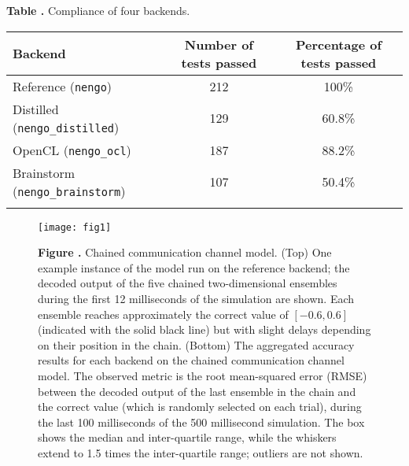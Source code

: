 \documentclass{frontiersSCNS}
\begin{document}
\begin{table}[!ht]
\textbf{\label{Tab:01} Table .}{
  Compliance of four backends.}

\processtable{ }
{\begin{tabular}{lcc}\toprule
 Backend & Number of tests passed & Percentage of tests passed\\\midrule
 Reference (\texttt{nengo}) & 212 & 100\% \\
 Distilled (\texttt{nengo\_distilled}) & 129 & 60.8\% \\
 OpenCL (\texttt{nengo\_ocl}) & 187 & 88.2\% \\
 Brainstorm (\texttt{nengo\_brainstorm}) & 107 & 50.4\% \\\botrule
\end{tabular}}{}
\end{table}




\begin{figure}[!ht]
\begin{center}
  \texttt{[image: fig1]}
\end{center}
\textbf{\label{fig:01} Figure .}
       {Chained communication channel model. (Top) One example instance
         of the model run on the reference backend; the decoded output
         of the five chained two-dimensional ensembles during the first
         12 milliseconds of the simulation are shown.
         Each ensemble reaches approximately the correct value of
         $[-0.6, 0.6]$ (indicated with the solid black line)
         but with slight delays depending on their position in the chain.
         (Bottom) The aggregated accuracy results for each backend on the
         chained communication channel model. The observed metric is the root
         mean-squared error (RMSE) between the decoded output of the last
         ensemble in the chain and the correct value (which is randomly
         selected on each trial), during the last 100 milliseconds of the
         500 millisecond simulation. The box shows the median and
         inter-quartile range, while the whiskers extend to 1.5 times the
         inter-quartile range; outliers are not shown.}
\end{figure}
\end{document}
